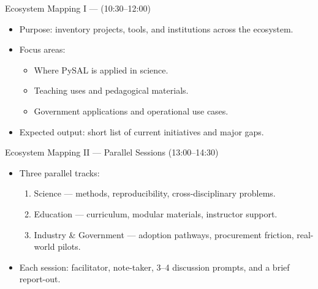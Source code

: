 \documentclass[11pt, aspectratio=169]{beamer}
\begin{document}
\begin{frame}{Ecosystem Mapping I — (10:30--12:00)}
  \begin{itemize}
    \item Purpose: inventory projects, tools, and institutions across the ecosystem.
    \item Focus areas:
      \begin{itemize}
        \item Where PySAL is applied in science.
        \item Teaching uses and pedagogical materials.
        \item Government applications and operational use cases.
      \end{itemize}
    \item Expected output: short list of current initiatives and major gaps.
  \end{itemize}

\end{frame}

\begin{frame}{Ecosystem Mapping II — Parallel Sessions (13:00--14:30)}
  \begin{itemize}
    \item Three parallel tracks:
      \begin{enumerate}
        \item Science — methods, reproducibility, cross-disciplinary problems.
        \item Education — curriculum, modular materials, instructor support.
        \item Industry \& Government — adoption pathways, procurement friction, real-world pilots.
      \end{enumerate}
    \item Each session: facilitator, note-taker, 3–4 discussion prompts, and a brief report-out.
  \end{itemize}

\end{frame}
\end{document}

